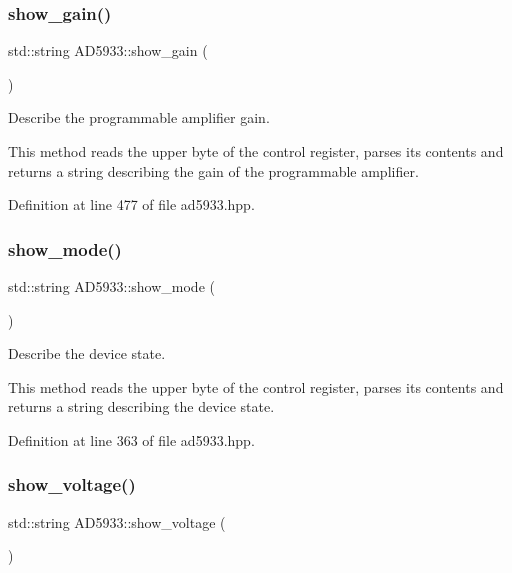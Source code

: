 \mbox{\label{struct_a_d5933_a2cbd4c63481455a0fe83a4b5413bd292}} 
\subsubsection{\texorpdfstring{show\+\_\+gain()}{show\_gain()}}
{\footnotesize\ttfamily std\+::string A\+D5933\+::show\+\_\+gain (\begin{DoxyParamCaption}{ }\end{DoxyParamCaption})}



Describe the programmable amplifier gain. 

This method reads the upper byte of the control register, parses its contents and returns a string describing the gain of the programmable amplifier. 

Definition at line 477 of file ad5933.\+hpp.

\mbox{\label{struct_a_d5933_a2b05a8fa5cab640c277ae0ece4f6d7cd}} 
\subsubsection{\texorpdfstring{show\+\_\+mode()}{show\_mode()}}
{\footnotesize\ttfamily std\+::string A\+D5933\+::show\+\_\+mode (\begin{DoxyParamCaption}{ }\end{DoxyParamCaption})}



Describe the device state. 

This method reads the upper byte of the control register, parses its contents and returns a string describing the device state. 

Definition at line 363 of file ad5933.\+hpp.

\mbox{\label{struct_a_d5933_a8db9035d025b0813d1f1271c94e000be}} 
\subsubsection{\texorpdfstring{show\+\_\+voltage()}{show\_voltage()}}
{\footnotesize\ttfamily std\+::string A\+D5933\+::show\+\_\+voltage (\begin{DoxyParamCaption}{ }\end{DoxyParamCaption})}



